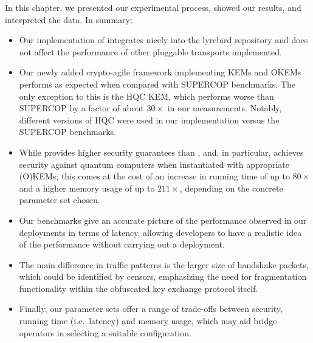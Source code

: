 In this chapter, we presented our experimental process, showed our results, and interpreted the data. In summary:
\begin{itemize}
    \item Our implementation of \drivel{} integrates nicely into the lyrebird repository and does not affect the performance of other pluggable transports implemented.

    \item Our newly added crypto-agile framework implementing KEMs and OKEMs performs as expected when compared with SUPERCOP benchmarks. The only exception to this is the HQC KEM, which performs worse than SUPERCOP by a factor of about $30\times$ in our measurements. Notably, different versions of HQC were used in our implementation versus the SUPERCOP benchmarks.

    \item While \drivel{} provides higher security guarantees than \obfsfour{}, and, in particular, achieves security against quantum computers when instantiated with appropriate (O)KEMs; this comes at the cost of an increase in running time of up to $80\times$ and a higher memory usage of up to $211\times$, depending on the concrete parameter set chosen.

    \item Our benchmarks give an accurate picture of the performance observed in our deployments in terms of latency, allowing developers to have a realistic idea of the performance without carrying out a deployment.

    \item The main difference in traffic patterns is the larger size of handshake packets, which could be identified by censors, emphasizing the need for fragmentation functionality within the obfuscated key exchange protocol itself.

    \item Finally, our parameter sets offer a range of trade-offs between security, running time (i.e.~latency) and memory usage, which may aid bridge operators in selecting a suitable configuration.
\end{itemize}
